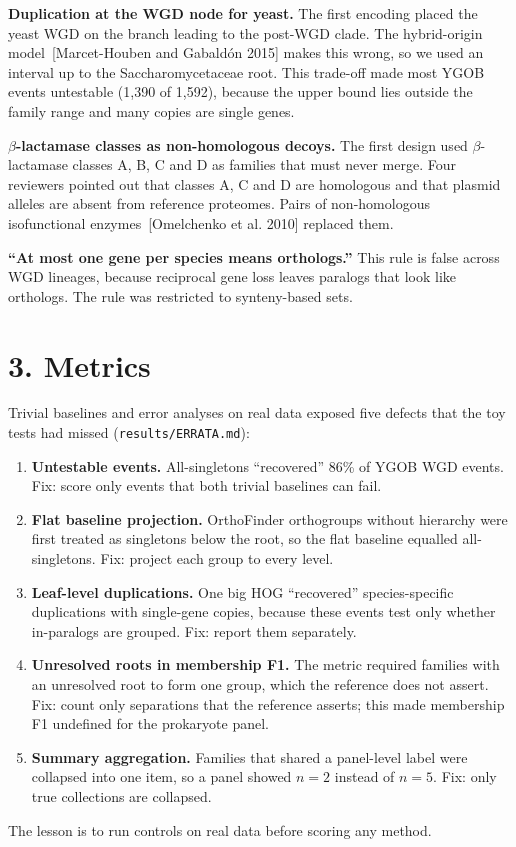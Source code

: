 \documentclass[10pt]{article}
\begin{document}
\textbf{Duplication at the WGD node for yeast.} The first encoding placed the yeast WGD on the branch leading to the
post-WGD clade. The hybrid-origin model~[Marcet-Houben and Gabaldón 2015] makes this wrong, so we used an interval up
to the Saccharomycetaceae root. This trade-off made most YGOB events untestable (1,390 of 1,592), because the upper
bound lies outside the family range and many copies are single genes.

\textbf{$\beta$-lactamase classes as non-homologous decoys.} The first design used $\beta$-lactamase classes A, B, C
and D as families that must never merge. Four reviewers pointed out that classes A, C and D are homologous and that
plasmid alleles are absent from reference proteomes. Pairs of non-homologous isofunctional enzymes~[Omelchenko et
al. 2010] replaced them.

\textbf{``At most one gene per species means orthologs.''} This rule is false across WGD lineages, because reciprocal
gene loss leaves paralogs that look like orthologs. The rule was restricted to synteny-based sets.

\section*{3. Metrics}
Trivial baselines and error analyses on real data exposed five defects that the toy tests had missed (\texttt{results/ERRATA.md}):
\begin{enumerate}
\item \textbf{Untestable events.} All-singletons ``recovered'' 86\% of YGOB WGD events. Fix: score only events that
both trivial baselines can fail.
\item \textbf{Flat baseline projection.} OrthoFinder orthogroups without hierarchy were first treated as singletons
below the root, so the flat baseline equalled all-singletons. Fix: project each group to every level.
\item \textbf{Leaf-level duplications.} One big HOG ``recovered'' species-specific duplications with single-gene
copies, because these events test only whether in-paralogs are grouped. Fix: report them separately.
\item \textbf{Unresolved roots in membership F1.} The metric required families with an unresolved root to form one
group, which the reference does not assert. Fix: count only separations that the reference asserts; this made
membership F1 undefined for the prokaryote panel.
\item \textbf{Summary aggregation.} Families that shared a panel-level label were collapsed into one item, so a panel
showed $n=2$ instead of $n=5$. Fix: only true collections are collapsed.
\end{enumerate}
The lesson is to run controls on real data before scoring any method.
\end{document}
